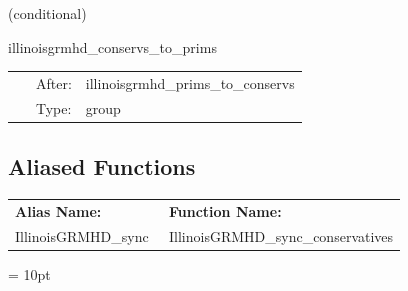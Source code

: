 \documentclass{article}
\begin{document}
\vspace{5mm}

   (conditional) 

\hspace{5mm} illinoisgrmhd\_conservs\_to\_prims 

\hspace{5mm}{\it compute primitive variables from conservatives } 


\hspace{5mm}

 \begin{tabular*}{160mm}{cll} 
~ & After:  & illinoisgrmhd\_prims\_to\_conservs \\ 
~ & Type:  & group \\ 
\end{tabular*} 


\subsection*{Aliased Functions}

\hspace{5mm}

 \begin{tabular*}{160mm}{ll} 

{\bf Alias Name:} ~~~~~~~ & {\bf Function Name:} \\ 
IllinoisGRMHD\_sync & IllinoisGRMHD\_sync\_conservatives \\ 
\end{tabular*} 



\vspace{5mm}\parskip = 10pt 
\end{document}
